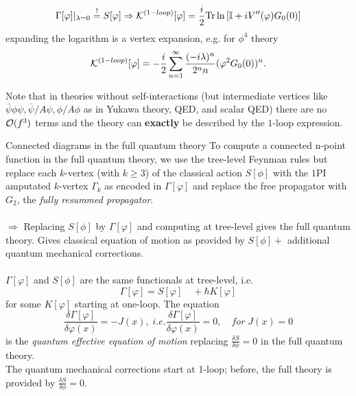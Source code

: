 \begin{mybox}{}
 	\begin{equation}
 	\label{eq:quantumactiononeLoop}
 		\Gamma[\varphi] |_{\lambda=0} \stackrel{!}{=} S[\varphi] \Rightarrow \mathcal{K}^{(1-loop)}[\varphi] = \frac{i}{2}\mathrm{Tr}\ln\left[\mathbb{I}+iV^{\prime \prime} (\varphi) G_0(0)\right]
 	\end{equation}
 	expanding the logarithm is a vertex expansion, e.g. for $\phi^4$ theory
 	\begin{equation}
 	\mathcal{K}^{(1-loop)}[\varphi] = -\frac{i}{2} \sum_{n=1}^{\infty} \frac{(-i\lambda)^n}{2^n n} (\varphi^2 G_0(0))^n.
 	\end{equation}
 \end{mybox}
Note that in theories without self-interactions (but intermediate vertices like $\bar{ \psi}\phi \psi,\bar{ \psi} \slash{A} \psi,\phi\slash{A}\phi$ as in Yukawa theory, QED, and scalar QED) there are no $\mathcal{O}(f^3)$ terms and the theory can \textbf{exactly} be described by the $1$-loop expression.
 \begin{mybox}{Connected diagrams in the full quantum theory}
 	To compute a connected n-point function in the full quantum theory, we use the tree-level Feynman rules but replace each $k$-vertex (with $k\geq 3$) of the classical action $S[\phi]$ with the $1$PI amputated $k$-vertex $\Gamma_k$ as encoded in $\Gamma[\varphi]$ and replace the free propagator with $G_2$, the \emph{fully resummed propagator}.\\
 	\\
 	$\Rightarrow$ Replacing $S[\phi]$ by $\Gamma[\varphi]$ and computing at tree-level gives the full quantum theory. Gives classical equation of motion as provided by $S[\phi] +$ additional quantum mechanical corrections.\\
 	\\
 	$\Gamma[\varphi]$ and $S[\phi]$ are the same functionals at tree-level, i.e. 
 	\begin{equation}
 		\Gamma[\varphi] = S[\varphi] \quad + \hbar K[\varphi] 
 	\end{equation}
 	for some $K[\varphi]$ starting at one-loop. The equation
 	\begin{equation}
 		\frac{\delta \Gamma [\varphi]}{\delta \varphi(x)} = - J(x), \; i.e. \frac{\delta \Gamma[\varphi]}{\delta \varphi(x)} = 0, \quad for \; J(x) =0
 	\end{equation}
 	is the \emph{quantum effective equation of motion} replacing $\frac{\delta S}{\delta \phi}=0$ in the full quantum theory.\\
 	The quantum mechanical corrections start at 1-loop; before, the full theory is provided by $\frac{\delta S}{\delta \phi}=0$.
 \end{mybox}
